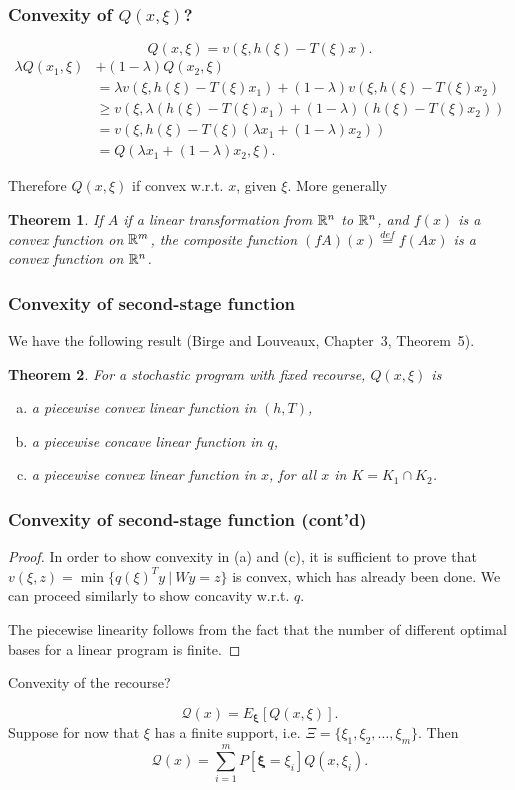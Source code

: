 \documentclass{beamer}
\newtheorem{theo}{Theorem}
\def\bxi{\boldsymbol\xi}
\def\bxi{\boldsymbol\xi}
\begin{document}
\begin{frame}
\frametitle{Convexity of $Q(x, \xi)$?}

\[
Q(x,\xi) = v(\xi, h(\xi)-T(\xi)x).
\]
\begin{align*}
\lambda Q(x_1, \xi) &+ (1-\lambda) Q(x_2, \xi) \\
&= \lambda v(\xi, h(\xi)-T(\xi)x_1) + (1-\lambda) v(\xi, h(\xi)-T(\xi)x_2) \\
&\geq v(\xi, \lambda (h(\xi)-T(\xi)x_1) + (1-\lambda)(h(\xi)-T(\xi)x_2)) \\
&= v(\xi, h(\xi)-T(\xi)(\lambda x_1 + (1-\lambda)x_2)) \\
&= Q(\lambda x_1 + (1-\lambda)x_2, \xi).
\end{align*}

Therefore {\red $Q(x, \xi)$ if convex} w.r.t. $x$, given $\xi$.
More generally
\begin{theo}
If $A$ if a linear transformation from $\mathbb{R}^n$ to $\mathbb{R}^n$, and $f(x)$ is a convex function on $\mathbb{R}^m$, the composite function $(fA)(x) \overset{def}{=} f(Ax)$ is a convex function on $\mathbb{R}^n$.
\end{theo}
\end{frame}

\begin{frame}
\frametitle{Convexity of second-stage function}

We have the following result (Birge and Louveaux, Chapter~3, Theorem~5).
\begin{theo}
For a stochastic program with fixed recourse, $Q(x,\xi)$ is
\begin{enumerate}[(a)]
\item
a piecewise convex linear function in $(h,T)$,
\item
a piecewise concave linear function in $q$,
\item
a piecewise convex linear function in $x$, for all $x$ in $K = K_1 \cap K_2$.
\end{enumerate}
\end{theo}

\end{frame}

\begin{frame}
\frametitle{Convexity of second-stage function (cont'd)}

\begin{proof}
In order to show convexity in (a) and (c), it is sufficient to prove that $v(\xi, z) = \min \lbrace q(\xi)^Ty \ |\ Wy = z \rbrace$ is convex, which has already been done.
We can proceed similarly to show concavity w.r.t. $q$.

The piecewise linearity follows from the fact that the number of different optimal bases for a linear program is finite.
\end{proof}

\mbox{}

{\red Convexity of the recourse?}

\[
\mathcal{Q}(x) = E_{\bxi} [Q(x,\xi)].
\]
Suppose for now that $\xi$ has a finite support, i.e. $\Xi = \lbrace \xi_1 ,
\xi_2,\ldots, \xi_m \rbrace$. Then
\[
\mathcal{Q}(x) = \sum_{i = 1}^{m} P[\bxi = \xi_i] Q(x,\xi_i).
\]
\end{frame}
\end{document}
